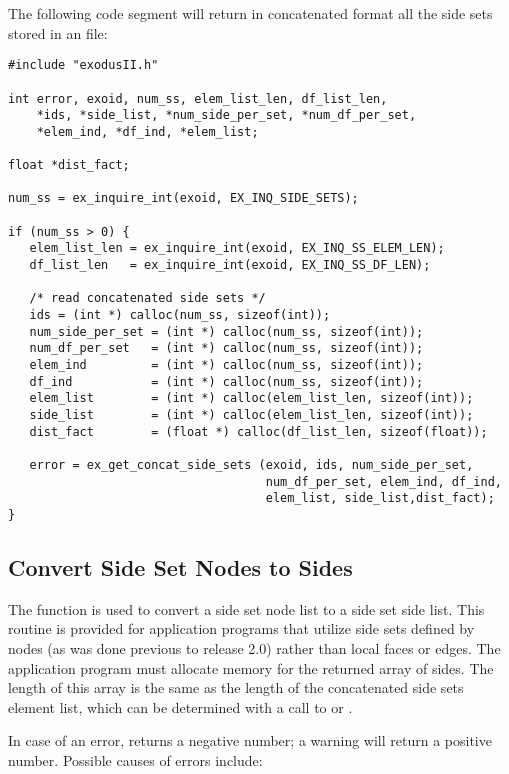 The following code segment will return in concatenated format 
all the side sets stored in an \exo{} file:

\begin{lstlisting}
#include "exodusII.h"

int error, exoid, num_ss, elem_list_len, df_list_len, 
    *ids, *side_list, *num_side_per_set, *num_df_per_set, 
    *elem_ind, *df_ind, *elem_list;

float *dist_fact;

num_ss = ex_inquire_int(exoid, EX_INQ_SIDE_SETS);

if (num_ss > 0) {
   elem_list_len = ex_inquire_int(exoid, EX_INQ_SS_ELEM_LEN);
   df_list_len   = ex_inquire_int(exoid, EX_INQ_SS_DF_LEN);

   /* read concatenated side sets */
   ids = (int *) calloc(num_ss, sizeof(int));
   num_side_per_set = (int *) calloc(num_ss, sizeof(int));
   num_df_per_set   = (int *) calloc(num_ss, sizeof(int));
   elem_ind         = (int *) calloc(num_ss, sizeof(int));
   df_ind           = (int *) calloc(num_ss, sizeof(int));
   elem_list        = (int *) calloc(elem_list_len, sizeof(int));
   side_list        = (int *) calloc(elem_list_len, sizeof(int));
   dist_fact        = (float *) calloc(df_list_len, sizeof(float));

   error = ex_get_concat_side_sets (exoid, ids, num_side_per_set, 
                                    num_df_per_set, elem_ind, df_ind, 
                                    elem_list, side_list,dist_fact);
}
\end{lstlisting}

\subsection{Convert Side Set Nodes to Sides}

The function  is used to convert a
side set node list to a side set side list. This routine is provided
for application programs that utilize side sets defined by nodes (as
was done previous to release 2.0) rather than local faces or
edges. The application program must allocate memory for the returned
array of sides. The length of this array is the same as the length of
the concatenated side sets element list, which can be determined with
a call to  or
.

In case of an error,  returns a
negative number; a warning will return a positive number. Possible
causes of errors include:

